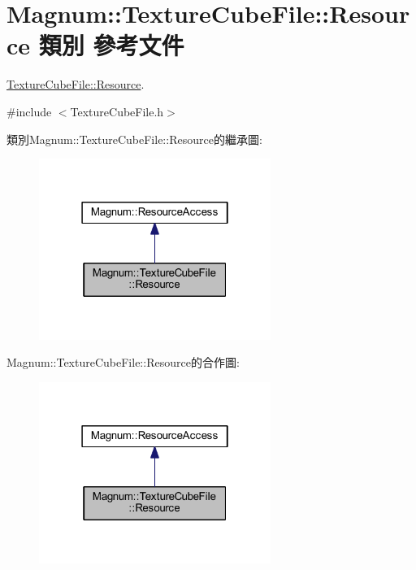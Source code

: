 \hypertarget{class_magnum_1_1_texture_cube_file_1_1_resource}{}\section{Magnum\+:\+:Texture\+Cube\+File\+:\+:Resource 類別 參考文件}
\label{class_magnum_1_1_texture_cube_file_1_1_resource}


\hyperlink{class_magnum_1_1_texture_cube_file_1_1_resource}{Texture\+Cube\+File\+::\+Resource}.  




{\ttfamily \#include $<$Texture\+Cube\+File.\+h$>$}



類別\+Magnum\+:\+:Texture\+Cube\+File\+:\+:Resource的繼承圖\+:\nopagebreak
\begin{figure}[H]
\begin{center}
\leavevmode
\includegraphics[width=214pt]{class_magnum_1_1_texture_cube_file_1_1_resource__inherit__graph}
\end{center}
\end{figure}


Magnum\+:\+:Texture\+Cube\+File\+:\+:Resource的合作圖\+:\nopagebreak
\begin{figure}[H]
\begin{center}
\leavevmode
\includegraphics[width=214pt]{class_magnum_1_1_texture_cube_file_1_1_resource__coll__graph}
\end{center}
\end{figure}
